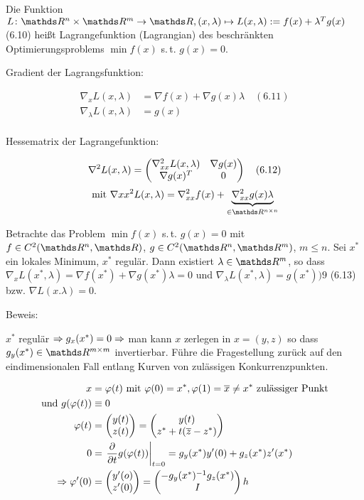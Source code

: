 
Die Funktion $L\colon \R^n \times \R^m \to \R, (x,\lambda) \mapsto L(x,\lambda) := f(x) + \lambda^T g(x)$ (6.10) heißt Lagrangefunktion (Lagrangian) des beschränkten Optimierungsproblems $\min f(x) $ s.\,t. $g(x)=0$.


Gradient der Lagrangsfunktion:

\begin{align*}
\nabla_x L(x,\lambda) &= \nabla f(x) + \nabla g(x) \lambda \quad (6.11) \\
\nabla_\lambda L(x,\lambda) &= g(x) \\
\end{align*}

Hessematrix der Lagrangefunktion:

\[ \nabla^2 L(x,\lambda) = \begin{pmatrix} \nabla_{xx}^2 L(x,\lambda) & \nabla g(x) \\ \nabla g(x)^T & 0 \end{pmatrix} \quad (6.12) \]
\[ \text{mit } \nabla{xx}^2 L(x,\lambda) = \nabla_{xx}^2 f(x) + \underbrace{\nabla_{xx}^2 g(x) \lambda}_{\in \R^{n\times n}} \]


Betrachte das Problem $\min f(x)$ s.\,t. $g(x)=0$ mit $f\in C^2(\R^n,\R)$, $g \in C^2(\R^n, \R^m)$, $m \leq n$. Sei $x^*$ ein lokales Minimum, $x^*$ regulär. Dann existiert $\lambda \in \R^m$, so dass $\nabla_x L(x^*,\lambda) = \nabla f(x^*) + \nabla g(x^*) \lambda = 0$ und $\nabla_\lambda L(x^*, \lambda) = g(x^*) ) 9$ (6.13) bzw. $\nabla L(x.\lambda)=0$.

Beweis:

$x^*$ regulär $\Rightarrow g_x(x^*) = 0 \Rightarrow $ man kann $x$ zerlegen in $x = (y,z)$ so dass $g_y(x^*) \in \R^{m\times m}$ invertierbar. Führe die Fragestellung zurück auf den eindimensionalen Fall entlang Kurven von zulässigen Konkurrenzpunkten.

\begin{align*}
x &= \varphi(t) \text{ mit } \varphi(0) = x^*, \varphi(1) = \overline x \neq x^* \text{ zulässiger Punkt} \\
\text{und } g(\varphi(t)) &\equiv 0 \\
\varphi(t) &= \begin{pmatrix} y(t) \\ z(t) \end{pmatrix} = \begin{pmatrix} y(t) \\ z^* + t(\overline z - z^*) \end{pmatrix} \\
0 &= \left. \frac{\partial}{\partial t} g(\varphi(t))\right|_{t=0} = g_y(x^*) y'(0) + g_z(x^*) z'(x^*) \\
\Rightarrow \varphi'(0) &= \begin{pmatrix} y'(o) \\ z'(0) \end{pmatrix} = \begin{pmatrix} -g_y(x^*)^{-1} g_z(x^*) \\ I \end{pmatrix} h \\
\end{align*}

